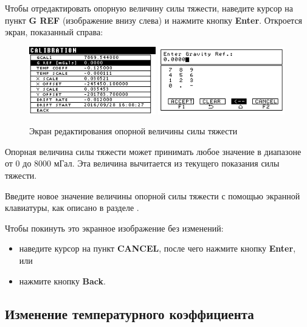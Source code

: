 Чтобы отредактировать опорную величину силы тяжести, наведите курсор на пункт
\textbf{G REF} (изображение внизу слева) и нажмите кнопку \textbf{Enter}.
Откроется экран, показанный справа:

\begin{figure}[H]
  \centering
  \includegraphics[width=0.49\textwidth]{figures/the_gravity_reference_value_editing_screen_1}
  \includegraphics[width=0.49\textwidth]{figures/the_gravity_reference_value_editing_screen_2}
  \caption{Экран редактирования опорной величины силы тяжести}
  \label{fig:the_gravity_reference_value_editing_screen}
\end{figure}

Опорная величина силы тяжести может принимать любое значение в диапазоне от 0 до
8000 мГал. Эта величина вычитается из текущего показания силы тяжести.

Введите новое значение величины опорной силы тяжести с помощью экранной
клавиатуры, как описано в разделе
.

Чтобы покинуть это экранное изображение без изменений:
\begin{itemize}
  \item наведите курсор на пункт \textbf{CANCEL}, после чего нажмите кнопку
    \textbf{Enter}, или

  \item нажмите кнопку \textbf{Back}.
\end{itemize}

\subsection{Изменение температурного коэффициента}


